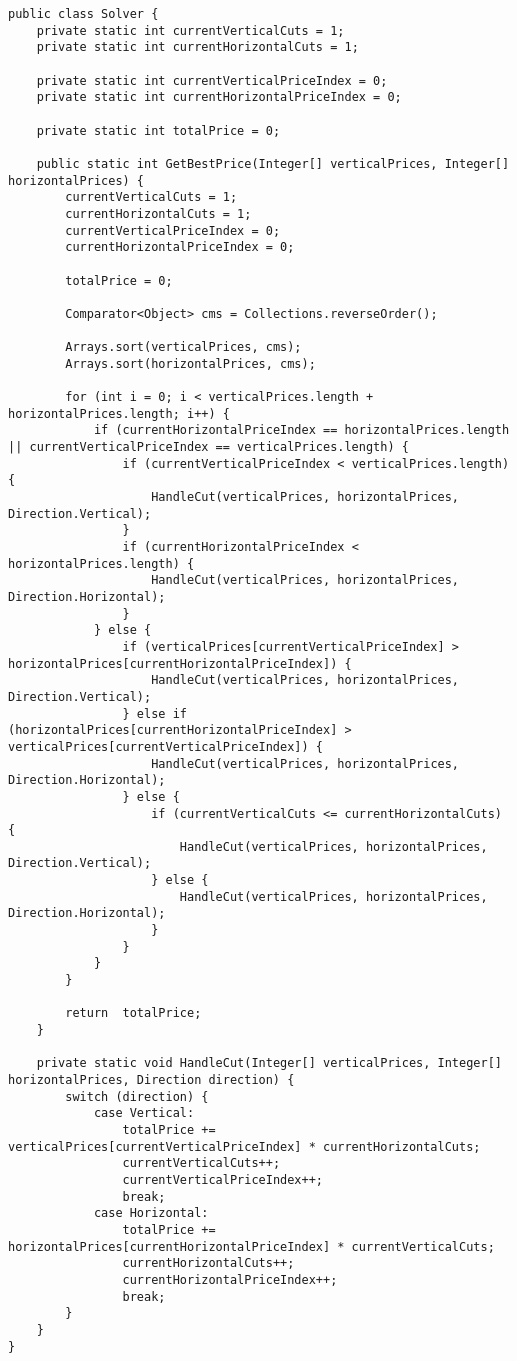 \documentclass[11pt]{article}
\begin{document}
\begin{lstlisting}[caption=Algorithme de résolution du problème, label={lst:algo}]
public class Solver {
    private static int currentVerticalCuts = 1;
    private static int currentHorizontalCuts = 1;

    private static int currentVerticalPriceIndex = 0;
    private static int currentHorizontalPriceIndex = 0;

    private static int totalPrice = 0;

    public static int GetBestPrice(Integer[] verticalPrices, Integer[] horizontalPrices) {
        currentVerticalCuts = 1;
        currentHorizontalCuts = 1;
        currentVerticalPriceIndex = 0;
        currentHorizontalPriceIndex = 0;

        totalPrice = 0;

        Comparator<Object> cms = Collections.reverseOrder();

        Arrays.sort(verticalPrices, cms);
        Arrays.sort(horizontalPrices, cms);

        for (int i = 0; i < verticalPrices.length + horizontalPrices.length; i++) {
            if (currentHorizontalPriceIndex == horizontalPrices.length || currentVerticalPriceIndex == verticalPrices.length) {
                if (currentVerticalPriceIndex < verticalPrices.length) {
                    HandleCut(verticalPrices, horizontalPrices, Direction.Vertical);
                }
                if (currentHorizontalPriceIndex < horizontalPrices.length) {
                    HandleCut(verticalPrices, horizontalPrices, Direction.Horizontal);
                }
            } else {
                if (verticalPrices[currentVerticalPriceIndex] > horizontalPrices[currentHorizontalPriceIndex]) {
                    HandleCut(verticalPrices, horizontalPrices, Direction.Vertical);
                } else if (horizontalPrices[currentHorizontalPriceIndex] > verticalPrices[currentVerticalPriceIndex]) {
                    HandleCut(verticalPrices, horizontalPrices, Direction.Horizontal);
                } else {
                    if (currentVerticalCuts <= currentHorizontalCuts) {
                        HandleCut(verticalPrices, horizontalPrices, Direction.Vertical);
                    } else {
                        HandleCut(verticalPrices, horizontalPrices, Direction.Horizontal);
                    }
                }
            }
        }

        return  totalPrice;
    }

    private static void HandleCut(Integer[] verticalPrices, Integer[] horizontalPrices, Direction direction) {
        switch (direction) {
            case Vertical:
                totalPrice += verticalPrices[currentVerticalPriceIndex] * currentHorizontalCuts;
                currentVerticalCuts++;
                currentVerticalPriceIndex++;
                break;
            case Horizontal:
                totalPrice += horizontalPrices[currentHorizontalPriceIndex] * currentVerticalCuts;
                currentHorizontalCuts++;
                currentHorizontalPriceIndex++;
                break;
        }
    }
}
\end{lstlisting}
\end{document}
